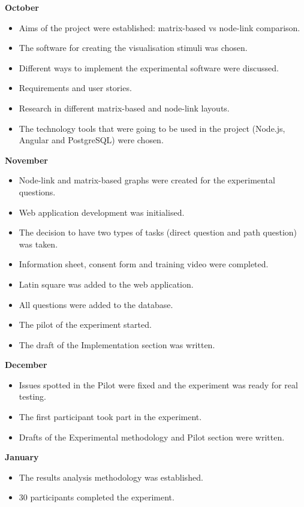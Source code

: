 \documentclass{l4proj}
\begin{document}
\begin{appendices}
{\bfseries October}
\begin{itemize}
	\item Aims of the project were established: matrix-based vs node-link comparison.
	\item The software for creating the visualisation stimuli was chosen.
	\item Different ways to implement the experimental software were discussed.
	\item Requirements and user stories.
	\item Research in different matrix-based and node-link layouts.
	\item The technology tools that were going to be used in the project (Node.js, Angular and PostgreSQL) were chosen. 
\end{itemize}

{\bfseries November}
\begin{itemize}
	\item Node-link and matrix-based graphs were created for the experimental questions.
	\item Web application development was initialised.
	\item The decision to have two types of tasks (direct question and path question) was taken.
	\item Information sheet, consent form and training video were completed.
	\item Latin square was added to the web application.
	\item All questions were added to the database.
	\item The pilot of the experiment started.
	\item The draft of the Implementation section was written.
\end{itemize}

{\bfseries December}
\begin{itemize}
	\item Issues spotted in the Pilot were fixed and the experiment was ready for real testing.
	\item The first participant took part in the experiment.
	\item Drafts of the Experimental methodology and Pilot section were written.
\end{itemize}

{\bfseries January}
\begin{itemize}
	\item The results analysis methodology was established.
	\item 30 participants completed the experiment.
\end{itemize}


\end{appendices}
\end{document}
